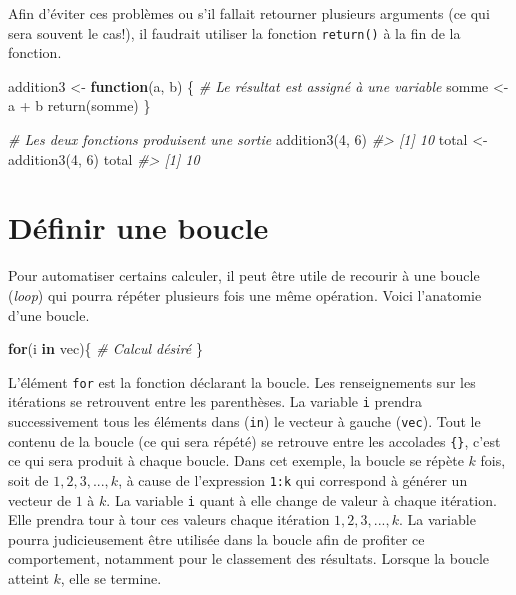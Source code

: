 \documentclass[
]{book}
\newenvironment{Shaded}{}{}
\newcommand{\CommentTok}[1]{\textit{#1}}
\newcommand{\ControlFlowTok}[1]{\textbf{#1}}
\newcommand{\DecValTok}[1]{#1}
\newcommand{\FunctionTok}[1]{#1}
\newcommand{\NormalTok}[1]{#1}
\newcommand{\OtherTok}[1]{#1}
\newcommand{\SpecialCharTok}[1]{#1}
\begin{document}
Afin d'éviter ces problèmes ou s'il fallait retourner plusieurs arguments (ce qui sera souvent le cas!), il faudrait utiliser la fonction \texttt{return()} à la fin de la fonction.

\begin{Shaded}
\begin{Highlighting}[]
\NormalTok{addition3 }\OtherTok{\textless{}{-}} \ControlFlowTok{function}\NormalTok{(a, b) \{}
  \CommentTok{\# Le résultat est assigné à une variable}
\NormalTok{  somme }\OtherTok{\textless{}{-}}\NormalTok{ a }\SpecialCharTok{+}\NormalTok{ b}
  \FunctionTok{return}\NormalTok{(somme)}
\NormalTok{\}}

\CommentTok{\# Les deux fonctions produisent une sortie}
\FunctionTok{addition3}\NormalTok{(}\DecValTok{4}\NormalTok{, }\DecValTok{6}\NormalTok{)}
\CommentTok{\#\textgreater{} [1] 10}
\NormalTok{total }\OtherTok{\textless{}{-}} \FunctionTok{addition3}\NormalTok{(}\DecValTok{4}\NormalTok{, }\DecValTok{6}\NormalTok{)}
\NormalTok{total}
\CommentTok{\#\textgreater{} [1] 10}
\end{Highlighting}
\end{Shaded}

\hypertarget{duxe9finir-une-boucle}{%
\section{Définir une boucle}\label{duxe9finir-une-boucle}}

Pour automatiser certains calculer, il peut être utile de recourir à une boucle (\emph{loop}) qui pourra répéter plusieurs fois une même opération. Voici l'anatomie d'une boucle.

\begin{Shaded}
\begin{Highlighting}[]
\ControlFlowTok{for}\NormalTok{(i }\ControlFlowTok{in}\NormalTok{ vec)\{}
  \CommentTok{\# Calcul désiré}
\NormalTok{\}}
\end{Highlighting}
\end{Shaded}

L'élément \texttt{for} est la fonction déclarant la boucle. Les renseignements sur les itérations se retrouvent entre les parenthèses. La variable \texttt{i} prendra successivement tous les éléments dans (\texttt{in}) le vecteur à gauche (\texttt{vec}). Tout le contenu de la boucle (ce qui sera répété) se retrouve entre les accolades \texttt{\{\}}, c'est ce qui sera produit à chaque boucle. Dans cet exemple, la boucle se répète \(k\) fois, soit de \(1,2,3,...,k\), à cause de l'expression \texttt{1:k} qui correspond à générer un vecteur de \(1\) à \(k\). La variable \texttt{i} quant à elle change de valeur à chaque itération. Elle prendra tour à tour ces valeurs chaque itération \(1,2,3,...,k\). La variable pourra judicieusement être utilisée dans la boucle afin de profiter ce comportement, notamment pour le classement des résultats. Lorsque la boucle atteint \(k\), elle se termine.
\end{document}
